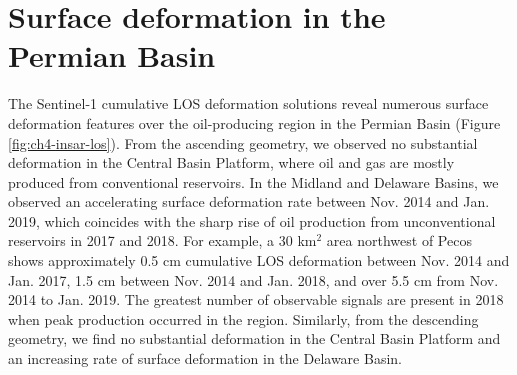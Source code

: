 




%


\section{Surface deformation in the Permian Basin}
\label{sec:ch4-results-defo}


The Sentinel-1 cumulative LOS deformation solutions reveal numerous surface deformation features over the oil-producing region in the Permian Basin (Figure \ref{fig:ch4-insar-los}). From the ascending geometry, we observed no substantial deformation in the Central Basin Platform, where oil and gas are mostly produced from conventional reservoirs. In the Midland and Delaware Basins, we observed an accelerating surface deformation rate between Nov. 2014 and Jan. 2019, which coincides with the sharp rise of oil production from unconventional reservoirs in 2017 and 2018. For example, a 30 km$^2 $ area northwest of Pecos shows approximately 0.5 cm cumulative LOS deformation between Nov. 2014 and Jan. 2017, 1.5 cm between Nov. 2014 and Jan. 2018, and over 5.5 cm from Nov. 2014 to Jan. 2019. The greatest number of observable signals are present in 2018 when peak production occurred in the region. Similarly, from the descending geometry, we find no substantial deformation in the Central Basin Platform and an increasing rate of surface deformation in the Delaware Basin. 


